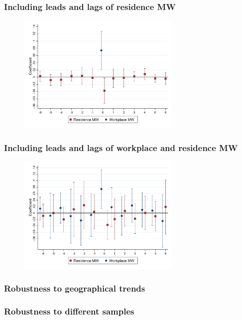 \documentclass[aspectratio=169, t]{beamer}
\begin{document}
\begin{frame}[label = dynamic_mw]
	\frametitle{Including leads and lags of residence MW}
	\begin{figure}[h!]
	\centering
		\includegraphics[width=0.7\textwidth]{fd_baseline/output/fd_both_ln_mw_dynamic.png}
	\end{figure}
	\hyperlink{dyn_baseline_plot}{}
\end{frame}

\begin{frame}[label = fd_both_dynamic]
	\frametitle{Including leads and lags of workplace and residence MW}
	\begin{figure}[h!]
	\centering
		\includegraphics[width=0.7\textwidth]{fd_baseline/output/fd_both_dynamic}
	\end{figure}
	\hyperlink{dyn_baseline_plot}{}
\end{frame}

\begin{frame}[label = robustness_geo]
	\frametitle{Robustness to geographical trends}
	
	
	
	\hyperlink{robus_sample}{}
\end{frame}

\begin{frame}[label = robustness_sample]
	\frametitle{Robustness to different samples}
	
	
	
	\hyperlink{robus_sample}{}
\end{frame}
\end{document}

